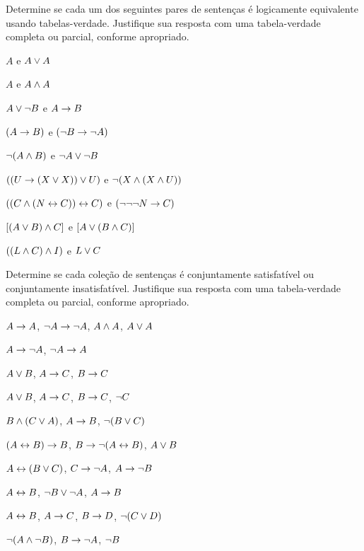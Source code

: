 \noindent\problempart
Determine se cada um dos seguintes pares de sentenças é logicamente equivalente usando tabelas-verdade. Justifique sua resposta com uma tabela-verdade completa ou parcial, conforme apropriado.
\begin{compactlist}
\item $A$ e $A \vee A$
\item $A$ e $A \wedge A$
\item $A \vee \neg B$ e $A\rightarrow B$
\item $(A \rightarrow B)$ e $(\neg B \rightarrow \neg A)$
\item $\neg(A \wedge B)$ e $\neg A \vee \neg B$
\item $ ((U \rightarrow (X \vee X)) \vee U)$ e $\neg (X \wedge (X \wedge U))$
\item $ ((C \wedge (N \leftrightarrow C)) \leftrightarrow C)$ e $(\neg \neg \neg N \rightarrow C)$
\item $[(A \vee B) \wedge C]$ e $[A \vee (B \wedge C)]$
\item $((L \wedge C) \wedge I)$ e $L \vee C$
\end{compactlist}


\noindent\problempart
\label{pr.TT.satisfiable5}
Determine se cada coleção de sentenças é conjuntamente satisfatível ou conjuntamente insatisfatível. Justifique sua resposta com uma tabela-verdade completa ou parcial, conforme apropriado.
\begin{compactlist}
\item $A\rightarrow A$, $\neg A \rightarrow \neg A$, $A\wedge A$, $A\vee A$ \vspace{.5ex} \hfill {}
\item $A \rightarrow \neg A$, $\neg A \rightarrow A$\vspace{.5ex} \hfill {}
\item $A\vee B$, $A\rightarrow C$, $B\rightarrow C$\vspace{.5ex} \hfill {}
\item $A \vee B$, $A \rightarrow C$, $B \rightarrow C$, $\neg C$\vspace{.5ex} \hfill {}
\item $B\wedge(C\vee A)$, $A\rightarrow B$, $\neg(B\vee C)$\vspace{.5ex}  \hfill {}
\item $(A \leftrightarrow B) \rightarrow B$,  $B \rightarrow \neg (A \leftrightarrow B)$, $A \vee B$ \vspace{.5ex} \hfill {}
\item $A\leftrightarrow(B\vee C)$, $C\rightarrow \neg A$, $A\rightarrow \neg B$\vspace{.5ex} \hfill {}
\item  $A \leftrightarrow B$,  $\neg B \vee \neg A$,  $A \rightarrow  B$ \vspace{.5ex} \hfill {}
\item $A \leftrightarrow B$, $A \rightarrow C$, $B \rightarrow D$, $\neg(C \vee D)$\vspace{.5ex} \hfill {}
\item $\neg (A \wedge \neg B)$,  $B \rightarrow \neg A$, $\neg B$  \vspace{.5ex} \hfill {}
\end{compactlist}

